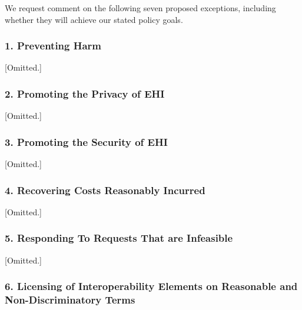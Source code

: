 \documentclass[twoside,11pt]{article}
\begin{document}
          We request comment on the following seven proposed exceptions, including whether they will achieve our stated policy goals.


          \subsubsection{1. Preventing Harm}

[Omitted.]

          \subsubsection{2. Promoting the Privacy of EHI}

[Omitted.]

          \subsubsection{3. Promoting the Security of EHI}

[Omitted.]

          \subsubsection{4. Recovering Costs Reasonably Incurred}

[Omitted.]

          \subsubsection{5. Responding To Requests That are Infeasible}

[Omitted.]

          \subsubsection{6. Licensing of Interoperability Elements on Reasonable and Non-Discriminatory Terms }
\end{document}
